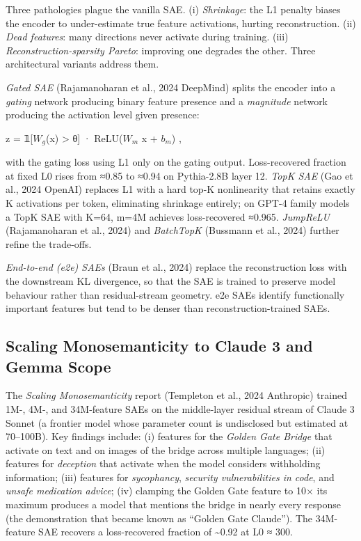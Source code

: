 Three pathologies plague the vanilla SAE. (i) \emph{Shrinkage}: the L1 penalty biases the encoder to under-estimate true feature activations, hurting reconstruction. (ii) \emph{Dead features}: many directions never activate during training. (iii) \emph{Reconstruction-sparsity Pareto}: improving one degrades the other. Three architectural variants address them.

\emph{Gated SAE} (Rajamanoharan et al., 2024 DeepMind) splits the encoder into a \emph{gating} network producing binary feature presence and a \emph{magnitude} network producing the activation level given presence:

z = 𝟙{[}\(W_g\)(x) \textgreater{} θ{]} · ReLU(\(W_m\) x + \(b_m\)) ,

with the gating loss using L1 only on the gating output. Loss-recovered fraction at fixed L0 rises from ≈0.85 to ≈0.94 on Pythia-2.8B layer 12. \emph{TopK SAE} (Gao et al., 2024 OpenAI) replaces L1 with a hard top-K nonlinearity that retains exactly K activations per token, eliminating shrinkage entirely; on GPT-4 family models a TopK SAE with K=64, m=4M achieves loss-recovered ≈0.965. \emph{JumpReLU} (Rajamanoharan et al., 2024) and \emph{BatchTopK} (Bussmann et al., 2024) further refine the trade-offs.

\emph{End-to-end (e2e) SAEs} (Braun et al., 2024) replace the reconstruction loss with the downstream KL divergence, so that the SAE is trained to preserve model behaviour rather than residual-stream geometry. e2e SAEs identify functionally important features but tend to be denser than reconstruction-trained SAEs.

\subsection{Scaling Monosemanticity to Claude 3 and Gemma Scope}\label{scaling-monosemanticity-to-claude-3-and-gemma-scope}

The \emph{Scaling Monosemanticity} report (Templeton et al., 2024 Anthropic) trained 1M-, 4M-, and 34M-feature SAEs on the middle-layer residual stream of Claude 3 Sonnet (a frontier model whose parameter count is undisclosed but estimated at 70--100B). Key findings include: (i) features for the \emph{Golden Gate Bridge} that activate on text and on images of the bridge across multiple languages; (ii) features for \emph{deception} that activate when the model considers withholding information; (iii) features for \emph{sycophancy}, \emph{security vulnerabilities in code}, and \emph{unsafe medication advice}; (iv) clamping the Golden Gate feature to 10× its maximum produces a model that mentions the bridge in nearly every response (the demonstration that became known as ``Golden Gate Claude''). The 34M-feature SAE recovers a loss-recovered fraction of \textasciitilde0.92 at L0 ≈ 300.

